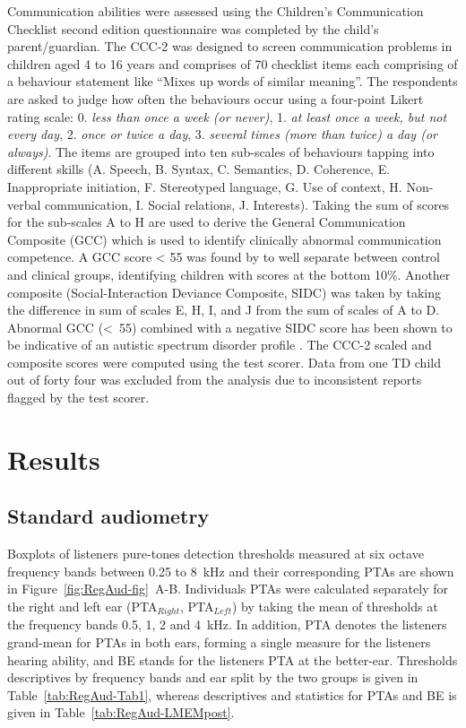 \documentclass[a4paper, twoside]{templates/ociamthesis}
\begin{document}
Communication abilities were assessed using the Children's Communication Checklist second edition questionnaire \autocite[CCC-2;][]{Bishop2003} was completed by the child's parent/guardian. The CCC-2 was designed to screen communication problems in children aged 4 to 16 years and comprises of 70 checklist items each comprising of a behaviour statement like ``Mixes up words of similar meaning''. The respondents are asked to judge how often the behaviours occur using a four-point Likert rating scale: 0. \emph{less than once a week (or never)}, 1. \emph{at least once a week, but not every day}, 2. \emph{once or twice a day}, 3. \emph{several times (more than twice) a day (or always)}. The items are grouped into ten sub-scales of behaviours tapping into different skills (A. Speech, B. Syntax, C. Semantics, D. Coherence, E. Inappropriate initiation, F. Stereotyped language, G. Use of context, H. Non-verbal communication, I. Social relations, J. Interests). Taking the sum of scores for the sub-scales A to H are used to derive the General Communication Composite (GCC) which is used to identify clinically abnormal communication competence. A GCC score \textless{} 55 was found by \textcite{Norbury2005} to well separate between control and clinical groups, identifying children with scores at the bottom 10\%. Another composite (Social-Interaction Deviance Composite, SIDC) was taken by taking the difference in sum of scales E, H, I, and J from the sum of scales of A to D. Abnormal GCC (\textless~55) combined with a negative SIDC score has been shown to be indicative of an autistic spectrum disorder profile \autocite{Bishop2003}. The CCC-2 scaled and composite scores were computed using the test scorer. Data from one TD child out of forty four was excluded from the analysis due to inconsistent reports flagged by the test scorer.

\hypertarget{results-3}{%
\section{Results}\label{results-3}}

\hypertarget{standard-audiometry-1}{%
\subsection{Standard audiometry}\label{standard-audiometry-1}}

Boxplots of listeners pure-tones detection thresholds measured at six octave frequency bands between 0.25 to 8~kHz and their corresponding PTAs are shown in Figure~\ref{fig:RegAud-fig}~A-B. Individuals PTAs were calculated separately for the right and left ear (PTA\(_{Right}\), PTA\(_{Left}\)) by taking the mean of thresholds at the frequency bands 0.5, 1, 2 and 4~kHz. In addition, PTA denotes the listeners grand-mean for PTAs in both ears, forming a single measure for the listeners hearing ability, and BE stands for the listeners PTA at the better-ear. Thresholds descriptives by frequency bands and ear split by the two groups is given in Table~\ref{tab:RegAud-Tab1}, whereas descriptives and statistics for PTAs and BE is given in Table~\ref{tab:RegAud-LMEMpost}.
\end{document}
